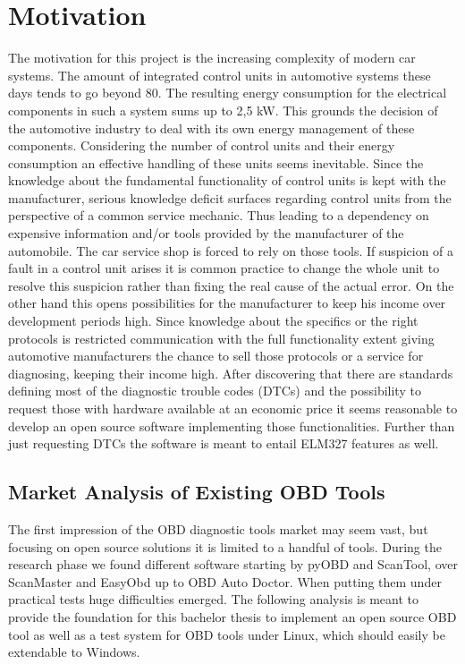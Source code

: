 
\chapter{Motivation}

The motivation for this project is the increasing complexity of modern car systems. The amount of integrated control units in automotive 
systems these days tends to go beyond 80. The resulting energy consumption for the electrical components in such a system sums up to 2,5 kW. 
This grounds the decision of the automotive industry to deal with its own energy management of these components. Considering the number of 
control units and their energy consumption an effective handling of these units seems inevitable. Since the knowledge about the fundamental 
functionality of control units is kept with the manufacturer, serious knowledge deficit surfaces regarding control units from the perspective 
of a common service mechanic. Thus leading to a dependency on expensive information and/or tools provided by the manufacturer of the automobile.
The car service shop is forced to rely on those tools. If suspicion of a fault in a control unit arises it is common practice to change the whole 
unit to resolve this suspicion rather than fixing the real cause of the actual error.
On the other hand this opens possibilities for the manufacturer to keep his income over development periods high. Since knowledge about the 
specifics or the right protocols is restricted communication with the full functionality extent giving automotive manufacturers the chance to 
sell those protocols or a service for diagnosing, keeping their income high.
After discovering that there are standards defining most of the diagnostic trouble codes (DTCs) and the possibility to request those with 
hardware available at an economic price it seems reasonable to develop an open source software implementing those functionalities. Further 
than just requesting DTCs the software is meant to entail ELM327 features as well. 

\section{Market Analysis of Existing OBD Tools}
The first impression of the OBD diagnostic tools market may seem vast, but focusing on open source solutions it is limited to a handful of tools.
During the research phase we found different software starting by pyOBD and ScanTool, over ScanMaster and EasyObd up to OBD Auto Doctor. 
When putting them under practical tests huge difficulties emerged. The following analysis is meant to provide the foundation for this bachelor 
thesis to implement an open source OBD tool as well as a test system for OBD tools under Linux, which should easily be extendable to Windows.

